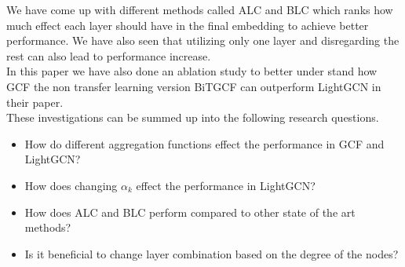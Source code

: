 We have come up with different methods called ALC and BLC which ranks how much effect each layer should have in the final embedding to achieve better performance.
We have also seen that utilizing only one layer and disregarding the rest can also lead to performance increase.
\\
In this paper we have also done an ablation study to better under stand how GCF the non transfer learning version BiTGCF can outperform LightGCN in their paper.
\\
These investigations can be summed up into the following research questions.
\begin{itemize}
    \item How do different aggregation functions effect the performance in GCF and LightGCN?
    \item How does changing $\alpha_k$ effect the performance in LightGCN?
    \item How does ALC and BLC perform compared to other state of the art methods?
    \item Is it beneficial to change layer combination based on the degree of the nodes?
\end{itemize}


